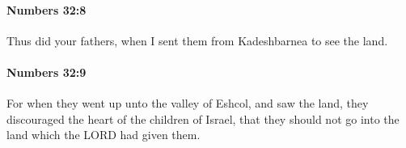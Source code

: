 		\paragraph{Numbers 32:8} %
			\label{NUMBERS-32-8}

			Thus did your fathers, when I sent them from Kadeshbarnea to see the land.


		\paragraph{Numbers 32:9} %
			\label{NUMBERS-32-9}

			For when they went up unto the valley of Eshcol, and saw the land, they discouraged the heart of the children of Israel, that they should not go into the land which the LORD had given them.


